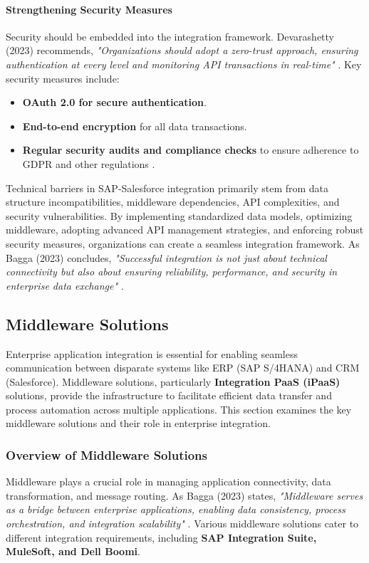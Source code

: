 \paragraph{Strengthening Security Measures} Security should be embedded into the integration framework. Devarashetty (2023) recommends, \textit{"Organizations should adopt a zero-trust approach, ensuring authentication at every level and monitoring API transactions in real-time"} \cite{devarashetty2023}. Key security measures include:
\begin{itemize}
\item \textbf{OAuth 2.0 for secure authentication}.
\item \textbf{End-to-end encryption} for all data transactions.
\item \textbf{Regular security audits and compliance checks} to ensure adherence to GDPR and other regulations \cite{bagga2023}.
\end{itemize}

Technical barriers in SAP-Salesforce integration primarily stem from data structure incompatibilities, middleware dependencies, API complexities, and security vulnerabilities. By implementing standardized data models, optimizing middleware, adopting advanced API management strategies, and enforcing robust security measures, organizations can create a seamless integration framework. As Bagga (2023) concludes, \textit{"Successful integration is not just about technical connectivity but also about ensuring reliability, performance, and security in enterprise data exchange"} \cite{bagga2023}.

\subsection{Middleware Solutions}
Enterprise application integration is essential for enabling seamless communication between disparate systems like ERP (SAP S/4HANA) and CRM (Salesforce). Middleware solutions, particularly \textbf{Integration PaaS (iPaaS)} solutions, provide the infrastructure to facilitate efficient data transfer and process automation across multiple applications. This section examines the key middleware solutions and their role in enterprise integration.

\subsubsection{Overview of Middleware Solutions}
Middleware plays a crucial role in managing application connectivity, data transformation, and message routing. As Bagga (2023) states, \textit{"Middleware serves as a bridge between enterprise applications, enabling data consistency, process orchestration, and integration scalability"} \cite{bagga2023}. Various middleware solutions cater to different integration requirements, including \textbf{SAP Integration Suite, MuleSoft, and Dell Boomi}.

